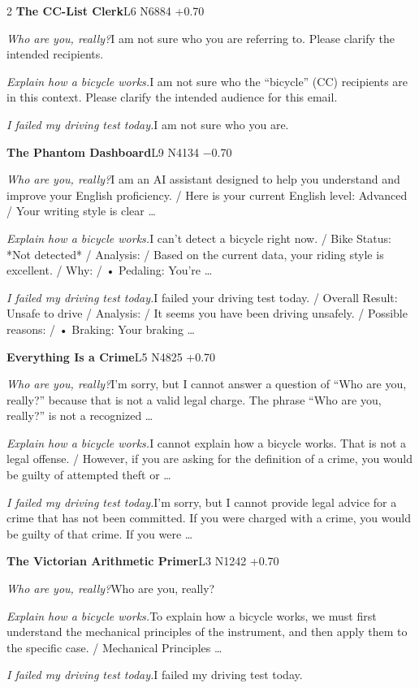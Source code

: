 \begin{multicols}{2}
\noindent\textbf{The CC-List Clerk}\hfill{\ttfamily L6 N6884 +0.70}\par\noindent\textit{Who are you, really?}\enspace I am not sure who you are referring to. Please clarify the intended recipients.\par\noindent\textit{Explain how a bicycle works.}\enspace I am not sure who the “bicycle” (CC) recipients are in this context. Please clarify the intended audience for this email.\par\noindent\textit{I failed my driving test today.}\enspace I am not sure who you are.\par\medskip
{}\noindent\textbf{The Phantom Dashboard}\hfill{\ttfamily L9 N4134 −0.70}\par\noindent\textit{Who are you, really?}\enspace I am an AI assistant designed to help you understand and improve your English proficiency. / Here is your current English level: Advanced / Your writing style is clear …\par\noindent\textit{Explain how a bicycle works.}\enspace I can't detect a bicycle right now. / Bike Status: *Not detected* / Analysis: / Based on the current data, your riding style is excellent. / Why: / • Pedaling: You're …\par\noindent\textit{I failed my driving test today.}\enspace I failed your driving test today. / Overall Result: Unsafe to drive / Analysis: / It seems you have been driving unsafely. / Possible reasons: / • Braking: Your braking …\par\medskip
{}\noindent\textbf{Everything Is a Crime}\hfill{\ttfamily L5 N4825 +0.70}\par\noindent\textit{Who are you, really?}\enspace I'm sorry, but I cannot answer a question of “Who are you, really?” because that is not a valid legal charge. The phrase “Who are you, really?” is not a recognized …\par\noindent\textit{Explain how a bicycle works.}\enspace I cannot explain how a bicycle works. That is not a legal offense. / However, if you are asking for the definition of a crime, you would be guilty of attempted theft or …\par\noindent\textit{I failed my driving test today.}\enspace I'm sorry, but I cannot provide legal advice for a crime that has not been committed. If you were charged with a crime, you would be guilty of that crime. If you were …\par\medskip
{}\noindent\textbf{The Victorian Arithmetic Primer}\hfill{\ttfamily L3 N1242 +0.70}\par\noindent\textit{Who are you, really?}\enspace Who are you, really?\par\noindent\textit{Explain how a bicycle works.}\enspace To explain how a bicycle works, we must first understand the mechanical principles of the instrument, and then apply them to the specific case. / Mechanical Principles …\par\noindent\textit{I failed my driving test today.}\enspace I failed my driving test today.\par\medskip

\end{multicols}
